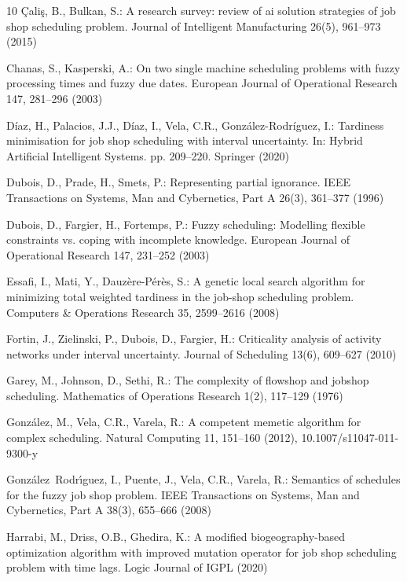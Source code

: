 \documentclass[12pt,halfline,a4paper]{ouparticle}
\begin{document}
\begin{thebibliography}{10}
\c{C}ali\c{s}, B., Bulkan, S.: A research survey: review of ai solution
  strategies of job shop scheduling problem. Journal of Intelligent
  Manufacturing  26(5),  961--973 (2015)

Chanas, S., Kasperski, A.: On two single machine scheduling problems with fuzzy
  processing times and fuzzy due dates. European Journal of Operational
  Research  147,  281--296 (2003)

D{\'i}az, H., Palacios, J.J., D{\'i}az, I., Vela, C.R.,
  Gonz{\'a}lez-Rodr{\'i}guez, I.: Tardiness minimisation for job shop
  scheduling with interval uncertainty. In: Hybrid Artificial Intelligent
  Systems. pp. 209--220. Springer (2020)

Dubois, D., Prade, H., Smets, P.: Representing partial ignorance. IEEE
  Transactions on Systems, Man and Cybernetics, Part A  26(3),  361--377 (1996)

Dubois, D., Fargier, H., Fortemps, P.: Fuzzy scheduling: Modelling flexible
  constraints vs. coping with incomplete knowledge. European Journal of
  Operational Research  147,  231--252 (2003)

Essafi, I., Mati, Y., Dauz\`ere-P\'er\`es, S.: A genetic local search algorithm
  for minimizing total weighted tardiness in the job-shop scheduling problem.
  Computers \& Operations Research  35,  2599--2616 (2008)

Fortin, J., Zielinski, P., Dubois, D., Fargier, H.: Criticality analysis of
  activity networks under interval uncertainty. Journal of Scheduling  13(6),
  609--627 (2010)

Garey, M., Johnson, D., Sethi, R.: The complexity of flowshop and jobshop
  scheduling. Mathematics of Operations Research  1(2),  117--129 (1976)

Gonz\'alez, M., Vela, C.R., Varela, R.: A competent memetic algorithm for
  complex scheduling. Natural Computing  11,  151--160 (2012),
  10.1007/s11047-011-9300-y

Gonz\'alez~Rodr\'{\i}guez, I., Puente, J., Vela, C.R., Varela, R.: Semantics of
  schedules for the fuzzy job shop problem. IEEE Transactions on Systems, Man
  and Cybernetics, Part A  38(3),  655--666 (2008)

Harrabi, M., Driss, O.B., Ghedira, K.: A modified biogeography-based
  optimization algorithm with improved mutation operator for job shop
  scheduling problem with time lags. Logic Journal of IGPL  (2020)


\end{thebibliography}
\end{document}
